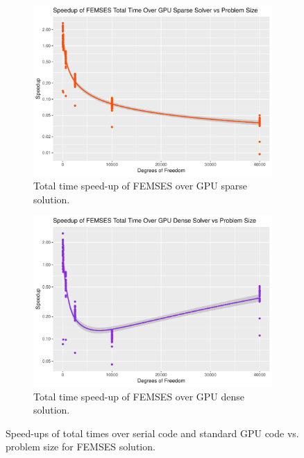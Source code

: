 \begin{figure}
\begin{subfigure}{0.48\linewidth}
		\centering
		\includegraphics[width=\linewidth]{Plots/total_femses_gpu_sparse_speedup_vs_n}
		\caption{Total time speed-up of FEMSES over GPU sparse solution.}
		\label{fig:tot_femses_gpu_sparse}
	\end{subfigure}\hfill
	\begin{subfigure}{0.48\linewidth}
		\centering
		\includegraphics[width=\linewidth]{Plots/total_femses_gpu_dense_speedup_vs_n}
		\caption{Total time speed-up of FEMSES over GPU dense solution.}
		\label{fig:tot_femses_gpu_dense}
	\end{subfigure}
	\caption{Speed-ups of total times over serial code and standard GPU code vs. problem size for FEMSES solution.}
	\label{fig:tot_femses}
\end{figure}

